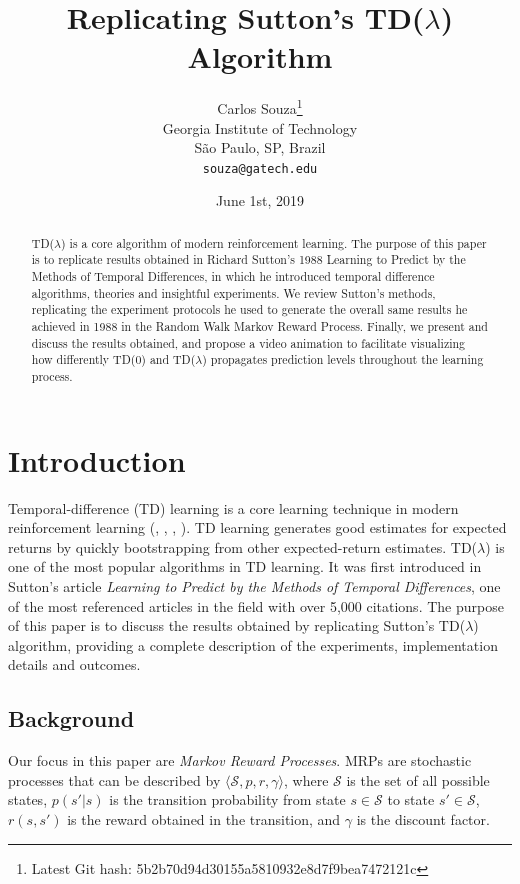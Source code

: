 \documentclass{article}
\title{Replicating Sutton's TD($\lambda$) Algorithm}
\date{June 1st, 2019}	%
\author{
  Carlos Souza\thanks{Latest Git hash: 5b2b70d94d30155a5810932e8d7f9bea7472121c}\\
  Georgia Institute of Technology\\
  São Paulo, SP, Brazil \\
  \texttt{souza@gatech.edu} \\
}
\begin{document}
\maketitle

\begin{abstract}
    TD($\lambda$) is a core algorithm of modern reinforcement learning.
    The purpose of this paper is to replicate results obtained in Richard Sutton's 1988 Learning to Predict by the Methods of Temporal Differences, in which he introduced temporal difference algorithms, theories and insightful experiments.
    We review Sutton's methods, replicating the experiment protocols he used to generate the overall same results he achieved in 1988 in the Random Walk Markov Reward Process.
    Finally, we present and discuss the results obtained, and propose a video animation to facilitate visualizing how differently TD(0) and TD($\lambda$) propagates prediction levels throughout the learning process.
\end{abstract}




\section{Introduction}
\label{sec:introduction}
Temporal-difference (TD) learning is a core learning technique in modern reinforcement learning (\cite{Sutton1988}, \cite{Sutton:1998:IRL:551283}, \cite{KLMSurvey}, \cite{Szepesvari:2010:ARL:1855083}).
TD learning generates good estimates for expected returns by quickly bootstrapping from other expected-return estimates.
TD($\lambda$) is one of the most popular algorithms in TD learning.
It was first introduced in Sutton's article \emph{Learning to Predict by the Methods of Temporal Differences}, one of the most referenced articles in the field with over 5,000 citations.
The purpose of this paper is to discuss the results obtained by replicating Sutton's TD($\lambda$) algorithm, providing a complete description of the experiments, implementation details and outcomes.

\subsection{Background}
\label{subsec:background}
Our focus in this paper are \emph{Markov Reward Processes}.
MRPs are stochastic processes that can be described by \(\langle\mathcal{S}, p, r, \gamma\rangle\), where \(\mathcal{S}\) is the set of all possible states, \(p(s'|s)\) is the transition probability from state \(s \in \mathcal{S}\) to state \(s' \in \mathcal{S}\), \(r(s, s')\) is the reward obtained in the transition, and \(\gamma\) is the discount factor.
\end{document}
